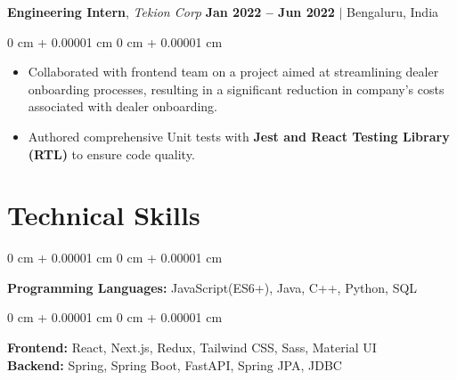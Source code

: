 \documentclass[10pt, letterpaper]{article}
\newenvironment{highlights}{
    \begin{itemize}[
        topsep=0.10 cm,     %
        parsep=0.10 cm,     %
        partopsep=0pt,      %
        itemsep=0pt,        %
        leftmargin=0 cm + 10pt  %
    ]
}{
    \end{itemize}
}
\newenvironment{onecolentry}{
    \begin{adjustwidth}{
        0 cm + 0.00001 cm
    }{
        0 cm + 0.00001 cm
    }
}{
    \end{adjustwidth}
}
\begin{document}
        \vspace{0.3 cm}

        \noindent
        \textbf{Engineering Intern}, {\color{darkgray}\textit{Tekion Corp}} \hfill {\color{darkgray}\small{ \textbf{Jan 2022 – Jun 2022} $|$ Bengaluru, India }}

        \vspace{0.10 cm}
        \begin{onecolentry}
            \begin{highlights}
                \item Collaborated with frontend team on a project aimed at streamlining dealer onboarding processes, resulting in a significant reduction in company's costs associated with dealer onboarding.
                \item Authored comprehensive Unit tests with \textbf{Jest and React Testing Library (RTL)} to ensure code quality.
            \end{highlights}
        \end{onecolentry}


    
    \section{Technical Skills}

        \begin{onecolentry}
        \textbf{Programming Languages:} JavaScript(ES6+), Java, C++, Python, SQL  %
        \end{onecolentry}
        
        \vspace{0.1 cm}
        
        \begin{onecolentry}
        \textbf{Frontend:} React, Next.js, Redux, Tailwind CSS, Sass, Material UI \\  %
        \vspace{0.1 cm}
        \textbf{Backend:} Spring, Spring Boot, FastAPI, Spring JPA, JDBC  %
        \end{onecolentry}
        
        \vspace{0.1 cm}
        
\end{document}
